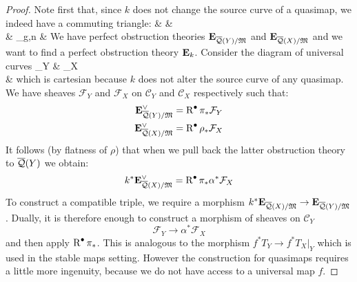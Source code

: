 \begin{proof} Note first that, since $k$ does not change the source curve of a quasimap, we indeed have a commuting triangle:
\bcd
{} \ar[rr,"k"] \ar[rd] & &  \ar[ld] \\
& \MM_{g,n} & 
\ecd
We have perfect obstruction theories $\mathbf{E}_{\overline{\mathcal{Q}}(Y)/\mathfrak M}$ and $\mathbf{E}_{\overline{\mathcal{Q}}(X)/\mathfrak M}$ and we want to find a perfect obstruction theory $\mathbf{E}_k$. Consider the diagram of universal curves
\bcd
{}_Y \ar[r,"\alpha"] \ar[d,"\pi"]  & _{X} \ar[d,"\rho"] \\
 \ar[r,"k"] & 
\ecd
which is cartesian because $k$ does not alter the source curve of any quasimap. We have sheaves $\mathcal{F}_Y$ and $\mathcal{F}_{X}$ on $\mathcal{C}_Y$ and $\mathcal{C}_{X}$ respectively such that:
\begin{align*} \mathbf{E}_{\overline{\mathcal{Q}}(Y)/\mathfrak M}^\vee & = \operatorname{R}^{\bullet} \pi_* \mathcal{F}_Y \\
\mathbf{E}_{\overline{\mathcal{Q}}(X)/\mathfrak M}^\vee & = \operatorname{R}^{\bullet} \rho_* \mathcal{F}_{X} \end{align*}
It follows (by flatness of $\rho$) that when we pull back the latter obstruction theory to $\overline{\mathcal{Q}}(Y)$ we obtain:
\begin{equation*} k^* \mathbf{E}_{\overline{\mathcal{Q}}(X)/\mathfrak M}^\vee = \operatorname{R}^{\bullet} \pi_* \alpha^* \mathcal{F}_{X} \end{equation*}
To construct a compatible triple, we require a morphism $k^* \mathbf{E}_{\overline{\mathcal{Q}}(X)/\mathfrak M} \rightarrow \mathbf{E}_{\overline{\mathcal{Q}}(Y)/\mathfrak M}$. Dually, it is therefore enough to construct a morphism of sheaves on $\mathcal{C}_Y$
\begin{equation*} \mathcal{F}_Y \to \alpha^* \mathcal{F}_{X} \end{equation*}
and then apply $\operatorname{R}^{\bullet} \pi_*$. This is analogous to the morphism $f^* T_Y \to f^* T_{X}|_Y$ which is used in the stable maps setting. However the construction for quasimaps requires a little more ingenuity, because we do not have access to a universal map $f$.


\end{proof}
